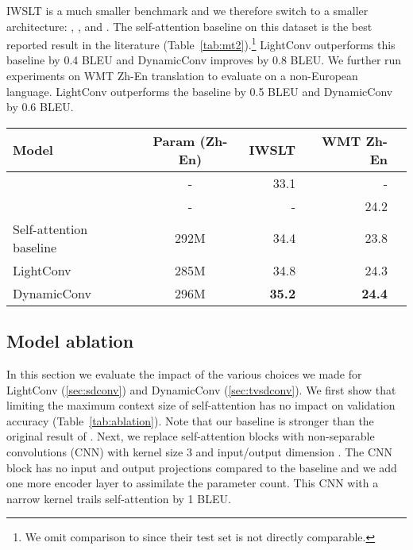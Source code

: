 \documentclass{article} \usepackage{iclr2019_conference,times}
\def\sdconv{LightConv}
\def\tvsdconv{DynamicConv}
\def\iwslt{IWSLT}
\def\zhen{WMT Zh-En}
\begin{document}
\iwslt{} is a much smaller benchmark and we therefore switch to a smaller architecture: , , and . 
The self-attention baseline on this dataset is the best reported result in the literature (Table~\ref{tab:mt2}).\footnote{We omit comparison to \citet{elbayad2018pervasiveattn} since their test set is not directly comparable.}
\sdconv{} outperforms this baseline by 0.4 BLEU and \tvsdconv{} improves by 0.8 BLEU.
We further run experiments on \zhen{} translation to evaluate on a non-European language.
\sdconv{} outperforms the baseline by 0.5 BLEU and \tvsdconv{} by 0.6 BLEU. 

\begin{table*}[t]
\centering
\begin{tabular}{lcrrr}
\toprule
Model & Param (Zh-En) & \iwslt{} & \zhen{} \\
\midrule
\citet{deng2018latent} & - & 33.1 & - \\
\cite{hassan2018parity} & - & - & 24.2 \\
\midrule
Self-attention baseline & 292M & 34.4 & 23.8 \\
\sdconv{} & 285M & 34.8 & 24.3 \\
\tvsdconv{} & 296M & \textbf{35.2} & \textbf{24.4} \\
\bottomrule
\end{tabular}
\caption{Machine translation accuracy in terms of BLEU on \iwslt{} and \zhen{}.}
\label{tab:mt2}
\end{table*}



\subsection{Model ablation}\label{sec:ablation}

In this section we evaluate the impact of the various choices we made for \sdconv{} (\textsection\ref{sec:sdconv}) and \tvsdconv{} (\textsection\ref{sec:tvsdconv}).
We first show that limiting the maximum context size of self-attention has no impact on validation accuracy (Table~\ref{tab:ablation}).
Note that our baseline is stronger than the original result of \citet{vaswani2017transformer}.
Next, we replace self-attention blocks with non-separable convolutions (CNN) with kernel size 3 and input/output dimension . 
The CNN block has no input and output projections compared to the baseline and we add one more encoder layer to assimilate the parameter count. 
This CNN with a narrow kernel trails self-attention by 1 BLEU.
\end{document}
